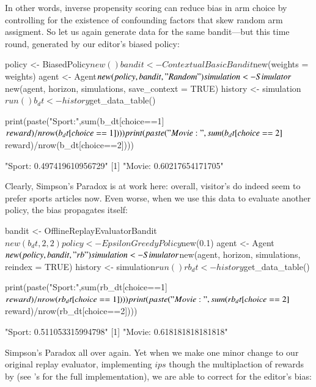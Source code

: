 \documentclass{jss}
\begin{document}
In other words, inverse propensity scoring can reduce bias in arm choice by controlling for the existence of confounding factors that skew random arm assigment. So let us again generate data for the same bandit---but this time round, generated by our editor's biased policy:

\begin{CodeChunk}
\begin{CodeInput}
policy             <- BiasedPolicy$new()
bandit             <- ContextualBasicBandit$new(weights = weights)
agent              <- Agent$new(policy, bandit, "Random")
simulation         <- Simulator$new(agent, horizon, simulations, save_context = TRUE)
history            <- simulation$run()
b_dt               <- history$get_data_table()

print(paste("Sport:",sum(b_dt[choice==1]$reward)/nrow(b_dt[choice==1])))
print(paste("Movie:",sum(b_dt[choice==2]$reward)/nrow(b_dt[choice==2])))
\end{CodeInput}
\begin{CodeOutput}
[1] "Sport: 0.497419610956729"
[1] "Movie: 0.60217654171705"
\end{CodeOutput}
\end{CodeChunk}

Clearly, Simpson's Paradox is at work here: overall, visitor's do indeed seem to prefer sports articles now. Even worse, when we use this data to evaluate another policy, the bias propagates itself:

\begin{CodeChunk}
\begin{CodeInput}
bandit             <- OfflineReplayEvaluatorBandit$new(b_dt,2,2)
policy             <- EpsilonGreedyPolicy$new(0.1)
agent              <- Agent$new(policy, bandit, "rb")
simulation         <- Simulator$new(agent, horizon, simulations, reindex = TRUE)
history            <- simulation$run()
rb_dt              <- history$get_data_table()

print(paste("Sport:",sum(rb_dt[choice==1]$reward)/nrow(rb_dt[choice==1])))
print(paste("Movie:",sum(rb_dt[choice==2]$reward)/nrow(rb_dt[choice==2])))
\end{CodeInput}
\begin{CodeOutput}
[1] "Sport: 0.511053315994798"
[1] "Movie: 0.618181818181818"
\end{CodeOutput}
\end{CodeChunk}

Simpson's Paradox all over again. Yet when we make one minor change to our original replay evaluator, implementing $ips$ though the multiplaction of rewards by  (see 's   for the full implementation), we are able to correct for the editor's bias:
\end{document}
